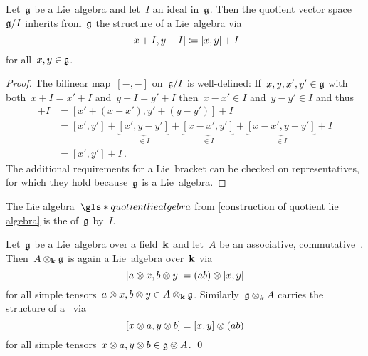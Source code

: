 \begin{lemma}
  \label{construction of quotient lie algebra}
  Let~$\mathfrak{g}$ be a Lie~algebra and let~$I$ an ideal in~$\mathfrak{g}$.
  Then the quotient vector space~$\mathfrak{g}/I$ inherits from~$\mathfrak{g}$ the structure of a Lie~algebra via
  \[
    [x+I, y+I]
    \coloneqq
    [x,y] + I
  \]
  for all~$x, y \in \mathfrak{g}$.
\end{lemma}


\begin{proof}
  The bilinear map~$[-,-]$ on~$\mathfrak{g}/I$ is well-defined:
  If~$x, y, x', y' \in \mathfrak{g}$ with both~$x+I = x'+I$ and~$y+I = y'+I$ then~$x-x' \in I$ and~$y-y' \in I$ and thus
  \begin{align*}
    [x,y] + I
    &=
    [x' + (x-x'), y' + (y-y')] + I \\
    &=
    [x',y']
    + \underbrace{[x', y-y']}_{\in I}
    + \underbrace{[x-x', y']}_{\in I}
    + \underbrace{[x-x', y-y']}_{\in I}
    + I
    \\
    &=
    [x', y'] + I  \,.
  \end{align*}
  The additional requirements for a Lie~bracket can be checked on representatives, for which they hold because~$\mathfrak{g}$ is a Lie~algebra.
\end{proof}


\begin{definition}
  The Lie algebra~$\gls*{quotient lie algebra}$ from \cref{construction of quotient lie algebra} is the  of~$\mathfrak{g}$ by~$I$.
\end{definition}


\begin{lemma}
  \label{quasi extension of scalars for lie algebras}
  Let~$\mathfrak{g}$ be a Lie~algebra over a field~$\kf$ and let~$A$ be an associative, commutative~{\algebra{$\kf$}}.
  Then~$A \otimes_{\mathbf{k}} \mathfrak{g}$ is again a Lie~algebra over~$\kf$ via
  \[
    [a \otimes x, b \otimes y]
    =
    (ab) \otimes [x,y]
  \]
  for all simple tensors~$a \otimes x, b \otimes y \in A \otimes_{\mathbf{k}} \mathfrak{g}$.
  Similarly~$\mathfrak{g} \otimes_k A$ carries the structure of a~{\liealgebra{$\kf$}} via
  \[
    [x \otimes a, y \otimes b]
    =
    [x,y] \otimes (ab)
  \]
  for all simple tensors~$x \otimes a, y \otimes b \in \mathfrak{g} \otimes A$.
  \qed
\end{lemma}


